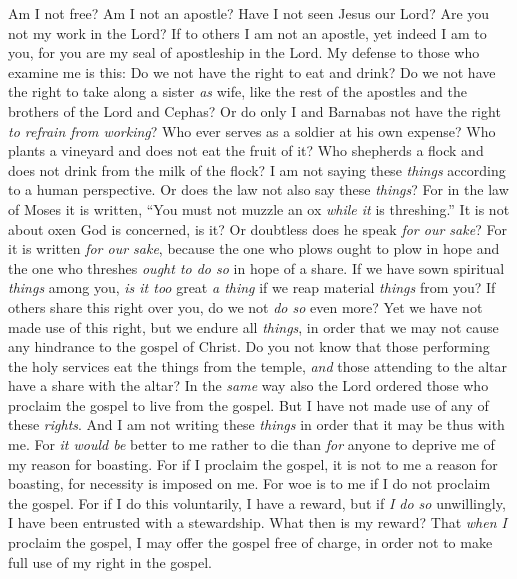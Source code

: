 \begin{biblechapter} %
 Am I not free? Am I not an apostle? Have I not seen Jesus our Lord? Are you not my work in the Lord?
\verse If to others I am not an apostle, yet indeed I am to you, for you are my seal of apostleship in the Lord.
\verse My defense to those who examine me is this:
\verse Do we not have the right to eat and drink?
\verse Do we not have the right to take along a sister \textit{as} wife, like the rest of the apostles and the brothers of the Lord and Cephas?
\verse Or do only I and Barnabas not have the right \textit{to refrain from working}?
\verse Who ever serves as a soldier at his own expense? Who plants a vineyard and does not eat the fruit of it? Who shepherds a flock and does not drink from the milk of the flock?
\verse I am not saying these \textit{things} according to a human perspective. Or does the law not also say these \textit{things}?
\verse For in the law of Moses it is written, “You must not muzzle an ox \textit{while it} is threshing.” It is not about oxen God is concerned, is it?
\verse Or doubtless does he speak \textit{for our sake}? For it is written \textit{for our sake}, because the one who plows ought to plow in hope and the one who threshes \textit{ought to do so} in hope of a share.
\verse If we have sown spiritual \textit{things} among you, \textit{is it too} great \textit{a thing} if we reap material \textit{things} from you?
\verse If others share this right over you, do we not \textit{do so} even more? Yet we have not made use of this right, but we endure all \textit{things}, in order that we may not cause any hindrance to the gospel of Christ.
\verse Do you not know that those performing the holy services eat the things from the temple, \textit{and} those attending to the altar have a share with the altar?
\verse In the \textit{same} way also the Lord ordered those who proclaim the gospel to live from the gospel.
\verse But I have not made use of any of these \textit{rights}. And I am not writing these \textit{things} in order that it may be thus with me. For \textit{it would be} better to me rather to die than \textit{for} anyone to deprive me of my reason for boasting.
\verse For if I proclaim the gospel, it is not to me a reason for boasting, for necessity is imposed on me. For woe is to me if I do not proclaim the gospel.
\verse For if I do this voluntarily, I have a reward, but if \textit{I do so} unwillingly, I have been entrusted with a stewardship.
\verse What then is my reward? That \textit{when I} proclaim the gospel, I may offer the gospel free of charge, in order not to make full use of my right in the gospel.

\end{biblechapter}
